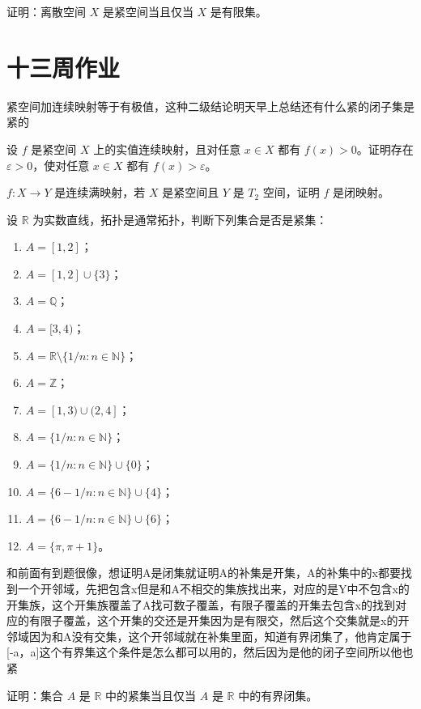 \begin{homework}[5.3]
证明：离散空间 $X$ 是紧空间当且仅当 $X$ 是有限集。
\end{homework}

\section{十三周作业}
\begin{dxtips}
    紧空间加连续映射等于有极值，这种二级结论明天早上总结还有什么紧的闭子集是紧的
\end{dxtips}
\begin{homework}[5.5]
设 $f$ 是紧空间 $X$ 上的实值连续映射，且对任意 $x\in X$ 都有 $f(x)>0$。证明存在 $\varepsilon>0$，使对任意 $x\in X$ 都有 $f(x)>\varepsilon$。
\end{homework}

\begin{homework}[10]
$f:X\to Y$ 是连续满映射，若 $X$ 是紧空间且 $Y$ 是 $T_2$ 空间，证明 $f$ 是闭映射。
\end{homework}

\begin{homework}[11]
设 $\mathbb R$ 为实数直线，拓扑是通常拓扑，判断下列集合是否是紧集：
\begin{enumerate}
  \item $A=[1,2]$；
  \item $A=[1,2]\cup\{3\}$；
  \item $A=\mathbb{Q}$；
  \item $A=[3,4)$；
  \item $A=\mathbb{R}\setminus\{1/n:n\in\mathbb{N}\}$；
  \item $A=\mathbb{Z}$；
  \item $A=[1,3)\cup(2,4]$；
  \item $A=\{1/n:n\in\mathbb{N}\}$；
  \item $A=\{1/n:n\in\mathbb{N}\}\cup\{0\}$；
  \item $A=\{6-1/n:n\in\mathbb{N}\}\cup\{4\}$；
  \item $A=\{6-1/n:n\in\mathbb{N}\}\cup\{6\}$；
  \item $A=\{\pi,\pi+1\}$。
\end{enumerate}
\end{homework}
\begin{dxtips}
    和前面有到题很像，想证明A是闭集就证明A的补集是开集，A的补集中的x都要找到一个开邻域，先把包含x但是和A不相交的集族找出来，对应的是Y中不包含x的开集族，这个开集族覆盖了A找可数子覆盖，有限子覆盖的开集去包含x的找到对应的有限子覆盖，这个开集的交还是开集因为是有限交，然后这个交集就是x的开邻域因为和A没有交集，这个开邻域就在补集里面，知道有界闭集了，他肯定属于[-a，a]这个有界集这个条件是怎么都可以用的，然后因为是他的闭子空间所以他也紧
\end{dxtips}
\begin{homework}[4]
证明：集合 $A$ 是 $\mathbb R$ 中的紧集当且仅当 $A$ 是 $\mathbb R$ 中的有界闭集。
\end{homework}

